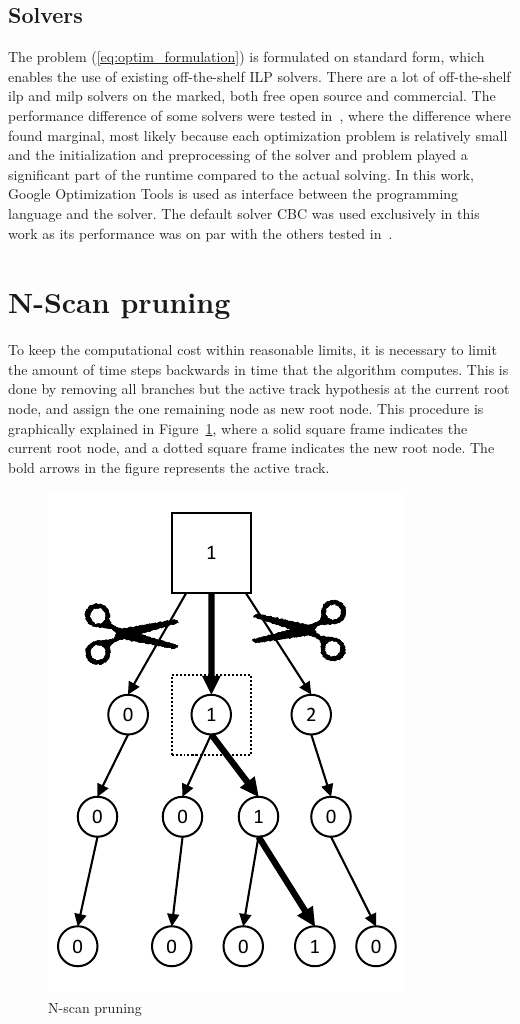 \subsection{Solvers}
The problem (\ref{eq:optim_formulation}) is formulated on standard form, which enables the use of existing off-the-shelf ILP solvers. There are a lot of off-the-shelf \gls{ilp} and \gls{milp} solvers on the marked, both free open source and commercial. The performance difference of some solvers were tested in~\cite{Liland_2017}, where the difference where found marginal,  most likely because each optimization problem is relatively small and the initialization and preprocessing of the solver and problem played a significant part of the runtime compared to the actual solving. In this work, Google Optimization Tools is used as interface between the programming language and the solver. The default solver CBC was used exclusively in this work as its performance was on par with the others tested in~\cite{Liland_2017}. 

\section{N-Scan pruning}
To keep the computational cost within reasonable limits, it is necessary to limit the amount of time steps backwards in time that the algorithm computes. This is done by removing all branches but the active track hypothesis at the current root node, and assign the one remaining node as new root node. This procedure is graphically explained in Figure~\ref{fig:pruned_tree}, where a solid square frame indicates the current root node, and a dotted square frame indicates the new root node. The bold arrows in the figure represents the active track.
\begin{figure}
\centering
\includegraphics[scale = .8]{Figures/Pruned-tree.pdf}
\caption{N-scan pruning}\label{fig:pruned_tree}
\end{figure}

